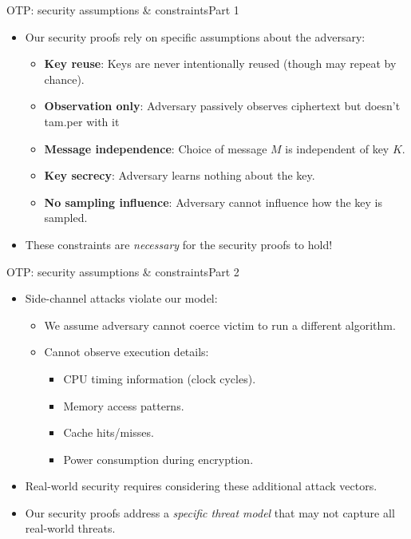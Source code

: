 \documentclass[aspectratio=169, lualatex, handout]{beamer}
\begin{document}
\begin{frame}{OTP: security assumptions \& constraints}{Part 1}
	\begin{itemize}[<+->]
		\item Our security proofs rely on specific assumptions about the adversary:
		      \begin{itemize}[<+->]
			      \item \textbf{Key reuse}: Keys are never intentionally reused (though may repeat by chance).
			      \item \textbf{Observation only}: Adversary passively observes ciphertext but doesn't tam.per with it
			      \item \textbf{Message independence}: Choice of message $M$ is independent of key $K$.
			      \item \textbf{Key secrecy}: Adversary learns nothing about the key.
			      \item \textbf{No sampling influence}: Adversary cannot influence how the key is sampled.
		      \end{itemize}
		\item These constraints are \textit{necessary} for the security proofs to hold!
	\end{itemize}
\end{frame}

\begin{frame}{OTP: security assumptions \& constraints}{Part 2}
	\begin{itemize}[<+->]
		\item Side-channel attacks violate our model:
		      \begin{itemize}[<+->]
			      \item We assume adversary cannot coerce victim to run a different algorithm.
			      \item Cannot observe execution details:
			            \begin{itemize}[<+->]
				            \item CPU timing information (clock cycles).
				            \item Memory access patterns.
				            \item Cache hits/misses.
				            \item Power consumption during encryption.
			            \end{itemize}
		      \end{itemize}
		\item Real-world security requires considering these additional attack vectors.
		\item Our security proofs address a \textit{specific threat model} that may not capture all real-world threats.
	\end{itemize}
\end{frame}
\end{document}
